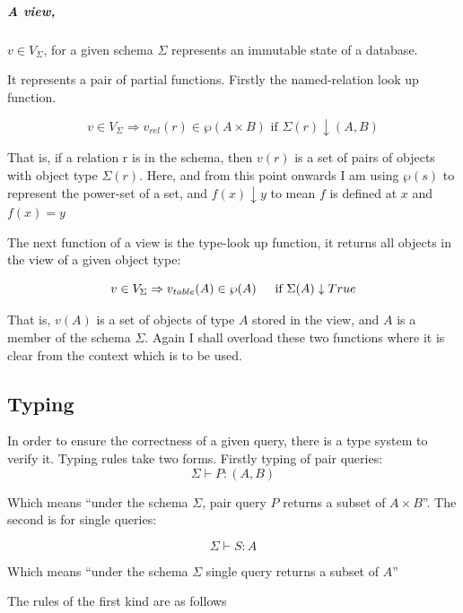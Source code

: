 \documentclass[12pt,a4paper,twoside,openright]{report}
\begin{document}
\subparagraph{A view,} $v \in V_\Sigma$, for a given schema $\Sigma$ represents an immutable state of a database.

It represents a pair of partial functions. Firstly the named-relation look up function.

\begin{equation}
v \in V_\Sigma \Rightarrow v_{rel}(r) \in \wp(A \times B)\mbox{ if $\Sigma(r)\downarrow (A, B)$}
\end{equation} 

That is, if a relation r is in the schema, then $v(r)$ is a set of pairs of objects with object type $\Sigma(r)$. Here, and from this point onwards I am using $\wp(s)$ to represent the power-set of a set, and $f(x) \downarrow y$ to mean $f$ is defined at $x$ and $f(x)=y$


The next function of a view is the type-look up function, it returns all objects in the view of a given object type:

\begin{equation}
v \in V_\Sigma \Rightarrow v_{table}(A) \in \wp(A)\indent \mbox{if $\Sigma(A)\downarrow True$}
\end{equation} 

That is, $v(A)$ is a set of objects of type $A$ stored in the view, and $A$ is a member of the schema $\Sigma$. Again I shall overload these two functions where it is clear from the context which is to be used.
 
\subsection{Typing}
In order to ensure the correctness of a given query, there is a type system to verify it. Typing rules take two forms. Firstly typing of pair queries:
\[ \Sigma \vdash P\colon (A, B)\]

Which means ``under the schema $\Sigma$, pair query $P$ returns a subset of $A \times B$''.  The second is for single queries:

\[ \Sigma \vdash S \colon A \]

Which means ``under the schema $\Sigma$ single query returns a subset of $A$''

The rules of the first kind are as follows
\end{document}
